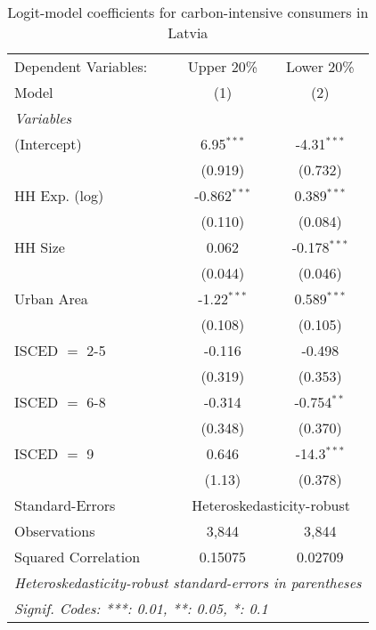 
\begin{table}[htbp!]
   \centering
   \small
   \begin{adjustbox}{width = 1\textwidth, max height = 0.95\textheight, center}
      \begin{threeparttable}[b]
         \caption{\label{tab:Logit_1_LVA} Logit-model coefficients for carbon-intensive consumers in Latvia}
         \begin{tabular}{lcc}
            \tabularnewline \midrule \midrule
            Dependent Variables: & Upper 20\%     & Lower 20\%\\   
            Model                & (1)            & (2)\\  
            \midrule
            \emph{Variables}\\
            (Intercept)          & 6.95$^{***}$   & -4.31$^{***}$\\   
                                 & (0.919)        & (0.732)\\   
            HH Exp. (log)        & -0.862$^{***}$ & 0.389$^{***}$\\   
                                 & (0.110)        & (0.084)\\   
            HH Size              & 0.062          & -0.178$^{***}$\\   
                                 & (0.044)        & (0.046)\\   
            Urban Area           & -1.22$^{***}$  & 0.589$^{***}$\\   
                                 & (0.108)        & (0.105)\\   
            ISCED $=$ 2-5        & -0.116         & -0.498\\   
                                 & (0.319)        & (0.353)\\   
            ISCED $=$ 6-8        & -0.314         & -0.754$^{**}$\\   
                                 & (0.348)        & (0.370)\\   
            ISCED $=$ 9          & 0.646          & -14.3$^{***}$\\   
                                 & (1.13)         & (0.378)\\   
            \midrule 
            Standard-Errors & \multicolumn{2}{c}{Heteroskedasticity-robust} \\ 
            Observations         & 3,844          & 3,844\\  
            Squared Correlation  & 0.15075        & 0.02709\\  
            \midrule \midrule
            \multicolumn{3}{l}{\emph{Heteroskedasticity-robust standard-errors in parentheses}}\\
            \multicolumn{3}{l}{\emph{Signif. Codes: ***: 0.01, **: 0.05, *: 0.1}}\\
         \end{tabular}
         

\end{threeparttable}
\end{adjustbox}
\end{table}
